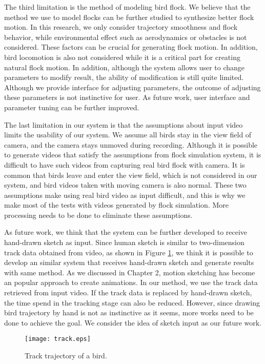 The third limitation is the method of modeling bird flock. We believe that the method we use to model flocks can be further studied to synthesize better flock motion. In this research, we only consider trajectory smoothness and flock behavior, while environmental effect such as aerodynamics or obstacles is not considered. These factors can be crucial for generating flock motion. In addition, bird locomotion is also not considered while it is a critical part for creating natural flock motion. In addition, although the system allows user to change parameters to modify result, the ability of modification is still quite limited. Although we provide interface for adjusting parameters, the outcome of adjusting these parameters is not instinctive for user. As future work, user interface and parameter tuning can be further improved.


The last limitation in our system is that the assumptions about input video limits the usability of our system. We assume all birds stay in the view field of camera, and the camera stays unmoved during recording. Although it is possible to generate videos that satisfy the assumptions from flock simulation system, it is difficult to have such videos from capturing real bird flock with camera. It is common that birds leave and enter the view field, which is not considered in our system, and bird videos taken with moving camera is also normal. These two assumptions make using real bird video as input difficult, and this is why we make most of the tests with videos generated by flock simulation. More processing needs to be done to eliminate these assumptions.



As future work, we think that the system can be further developed to receive hand-drawn sketch as input. Since human sketch is similar to two-dimension track data obtained from video, as shown in Figure \ref{figure:track}, we think it is possible to develop an similar system that receives hand-drawn sketch and generate results with same method. As we discussed in Chapter 2, motion sketching has become an popular approach to create animations. In our method, we use the track data retrieved from input video. If the track data is replaced by hand-drawn sketch, the time spend in the tracking stage can also be reduced. However, since drawing bird trajectory by hand is not as instinctive as it seems, more works need to be done to achieve the goal. We consider the idea of sketch input as our future work.


\begin{figure}[h]
 \begin{center}
  \texttt{[image: track.eps]}
 \end{center}
 \caption{Track trajectory of a bird.}
 \label{figure:track}
\end{figure}